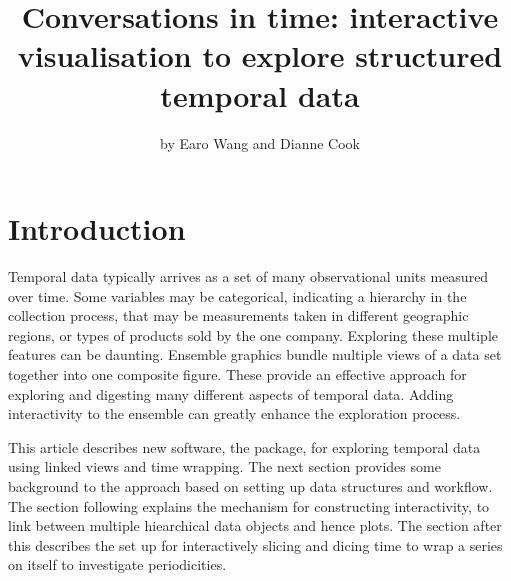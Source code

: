\title{Conversations in time: interactive visualisation to explore structured
temporal data}
\author{by Earo Wang and Dianne Cook}

\maketitle


\hypertarget{introduction}{%
\section{Introduction}\label{introduction}}

Temporal data typically arrives as a set of many observational units
measured over time. Some variables may be categorical, indicating a
hierarchy in the collection process, that may be measurements taken in
different geographic regions, or types of products sold by the one
company. Exploring these multiple features can be daunting. Ensemble
graphics \citep{unwin_ensemble_2018} bundle multiple views of a data set
together into one composite figure. These provide an effective approach
for exploring and digesting many different aspects of temporal data.
Adding interactivity to the ensemble can greatly enhance the exploration
process.

This article describes new software, the  package,
for exploring temporal data using linked views and time wrapping. The
next section provides some background to the approach based on setting
up data structures and workflow. The section following explains the
mechanism for constructing interactivity, to link between multiple
hiearchical data objects and hence plots. The section after this
describes the set up for interactively slicing and dicing time to wrap a
series on itself to investigate periodicities.

